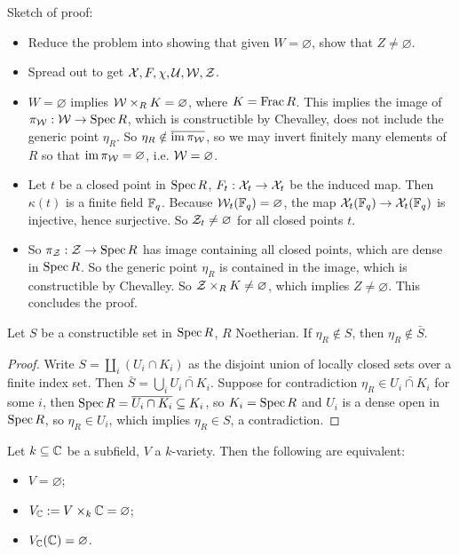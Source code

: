 \documentclass[11pt]{amsart}
\begin{document}
Sketch of proof:
\begin{itemize}
    \item Reduce the problem into showing that given $W = \varnothing$, show that $Z \neq \varnothing$.
    \item Spread out to get $\mathcal{X}, F, \chi, \mathcal{U}, \mathcal{W}, \mathcal{Z}$.
    \item $W = \varnothing$ implies $\mathcal{W}\times_R K = \varnothing$, where $K = \operatorname{Frac} R$. This implies the image of $\pi_{\mathcal{W}}: \mathcal{W} \to \operatorname{Spec} R$, which is constructible by Chevalley, does not include the generic point $\eta_R$. So $\eta_R\notin \overline{\operatorname{im} \pi_{\mathcal{W}}}$, so we may invert finitely many elements of $R$ so that $\operatorname{im} \pi_{\mathcal{W}} = \varnothing$, i.e. $\mathcal{W} = \varnothing$.
    \item Let $t$ be a closed point in $\operatorname{Spec} R$, $F_t: \mathcal{X}_t\to \mathcal{X}_t$ be the induced map. Then $\kappa(t)$ is a finite field $\mathbb{F}_q$. Because $\mathcal{W}_t(\mathbb{F}_q)=\varnothing$, the map $\mathcal{X}_t(\mathbb{F}_q) \to \mathcal{X}_t(\mathbb{F}_q)$ is injective, hence surjective. So $\mathcal{Z}_t\neq\varnothing$ for all closed points $t$.
    \item So $\pi_{\mathcal{Z}}:\mathcal{Z}\to \operatorname{Spec} R$ has image containing all closed points, which are dense in $\operatorname{Spec} R$. So the generic point $\eta_{R}$ is contained in the image, which is constructible by Chevalley. So $\mathcal{Z}\times_R K\neq\varnothing$, which implies $Z\neq\varnothing$. This concludes the proof.
\end{itemize}

\begin{lem}
Let $S$ be a constructible set in $\operatorname{Spec} R$, $R$ Noetherian. If $\eta_R\notin S$, then $\eta_R\notin \bar{S}$.
\end{lem}

\begin{proof}
Write $S = \coprod_i (U_i\cap K_i)$ as the disjoint union of locally closed sets over a finite index set. Then $\bar{S} = \bigcup_i \bar{U_i\cap K_i}$. Suppose for contradiction $\eta_R\in \bar{U_i\cap K_i}$ for some $i$, then $\operatorname{Spec} R = \overline{U_i\cap K_i} \subseteq K_i$, so $K_i = \operatorname{Spec} R$ and $U_i$ is a dense open in $\operatorname{Spec} R$, so $\eta_R\in U_i$, which implies $\eta_R\in S$, a contradiction.
\end{proof}



\begin{lem}
Let $k\subseteq \mathbb{C}$ be a subfield, $V$ a $k$-variety. Then the following are equivalent:
\begin{itemize}
    \item $V = \varnothing$;
    \item $V_{\mathbb{C}} := V\times_k \mathbb{C} = \varnothing$;
    \item $V_{\mathbb{C}}(\mathbb{C}) = \varnothing$.
\end{itemize}
\end{lem}
\end{document}
